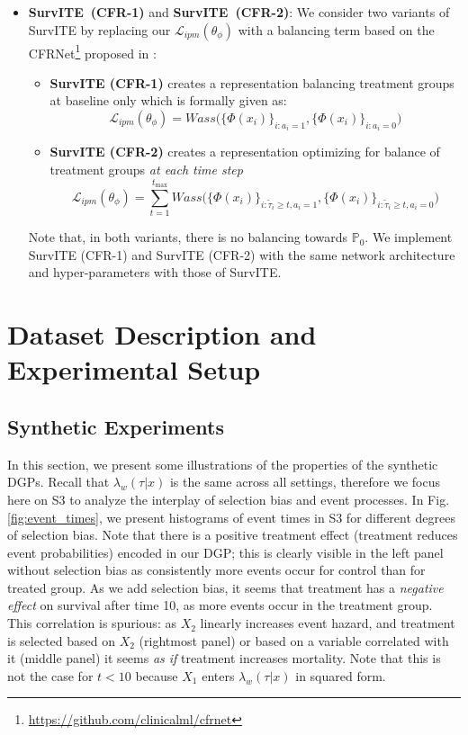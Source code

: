\documentclass{article}
\newcommand{\loss}{{\mathcal L}}
\newcommand{\proposed}{{SurvITE}}
\newcommand{\tmax}{{t_{\text{max}}}}
\begin{document}
\begin{itemize}[leftmargin=5.5mm]
    \item \textbf{\proposed~(CFR-1)} and \textbf{\proposed~(CFR-2)}: We consider two variants of SurvITE by replacing our $\loss_{ipm}(\theta_{\phi})$ with a balancing term based on the CFRNet\footnote{\url{https://github.com/clinicalml/cfrnet}} proposed in \cite{Shalit:16}: 
    \begin{itemize}[leftmargin=5.5mm]
        \item \textbf{SurvITE (CFR-1)} creates a representation balancing treatment groups at baseline only which is formally given as:
        \begin{equation}
            \loss_{ipm}(\theta_{\phi}) = Wass\big( \{ {\Phi}(x_{i}) \}_{i:a_{i}=1}, \{  {\Phi}(x_{i}) \}_{i:a_{i}=0} \big)
        \end{equation}
        \item \textbf{SurvITE (CFR-2)} creates a representation optimizing for balance of treatment groups \textit{at each time step}
        \begin{equation}
            \loss_{ipm}(\theta_{\phi}) = \sum_{t=1}^{\tmax} Wass\big( \{  {\Phi}(x_{i}) \}_{i:\tilde{\tau}_{i} \geq t, a_{i}=1}, \{  {\Phi}(x_{i}) \}_{i:\tilde{\tau}_{i} \geq t, a_{i}=0} \big)
        \end{equation}
    \end{itemize}
    Note that, in both variants, there is no balancing towards $\mathbb{P}_0$. We implement SurvITE (CFR-1) and SurvITE (CFR-2) with the same network architecture and hyper-parameters with those of SurvITE.
\end{itemize}




\section{Dataset Description and Experimental Setup} \newnumbering

\subsection{Synthetic Experiments}
In this section, we present some illustrations of the properties of the synthetic DGPs. Recall that $\lambda_w(\tau|x)$ is the same across all settings, therefore we focus here on S3 to analyze the interplay of selection bias and event processes. In Fig. \ref{fig:event_times}, we present histograms of event times in S3 for different degrees of selection bias. Note that there is a positive treatment effect (treatment reduces event probabilities) encoded in our DGP; this is clearly visible in the left panel without selection bias as consistently more events occur for control than for treated group. As we add selection bias, it seems that treatment has a \textit{negative effect} on survival after time 10, as more events occur in the treatment group. This correlation is spurious: as $X_2$ linearly increases event hazard, and treatment is selected based on $X_2$ (rightmost panel) or based on a variable correlated with it (middle panel) it seems \textit{as if} treatment increases mortality. Note that this is not the case for $t<10$ because $X_1$ enters $\lambda_w(\tau|x)$ in squared form. 
\end{document}
